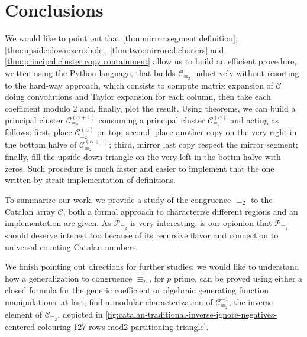 
\section{Conclusions}
\label{sec:conclusions}

We would like to point out that \autoref{thm:mirror:segment:definition},
\autoref{thm:upside:down:zero:hole}, \autoref{thm:two:mirrored:clusters} and
\autoref{thm:principal:cluster:copy:containment} allow us to build an efficient
procedure, written using the Python language, that builds $\mathcal{C}_{\equiv_{2}}$
inductively without resorting to the hard-way approach, which consists to compute
matrix expansion of $\mathcal{C}$ doing convolutions and Taylor expansion for each column, 
then take each coefficient modulo 2 and, finally, plot the result. Using theorems,
we can build a principal cluster $\mathcal{C}_{\equiv_{2}}^{(\alpha+1)}$ consuming
a principal cluster $\mathcal{C}_{\equiv_{2}}^{(\alpha)}$ and acting as follows:
first, place $\mathcal{C}_{\equiv_{2}}^{(\alpha)}$ on top; second, place another copy
on the very right in the bottom halve of $\mathcal{C}_{\equiv_{2}}^{(\alpha+1)}$;
third, mirror last copy respect the mirror segment; finally, fill the upside-down
triangle on the very left in the bottm halve with zeros. Such procedure is much faster
and easier to implement that the one written by strait implementation of definitions.

To summarize our work, we provide a study of the congruence $\equiv_{2}$ to the
Catalan array $\mathcal{C}$, both a formal approach to characterize different
regions and an implementation are given. As $\mathcal{P}_{\equiv_{2}}$ is very interesting,
is our opionion that $\mathcal{P}_{\equiv_{2}}$ should deserve interest too because
of its recursive flavor and connection to universal counting Catalan numbers.

We finish pointing out directions for further studies: we would like to understand
how a generalization to congruence $\equiv_{p}$, for $p$ prime, can be proved using
either a closed formula for the generic coefficient or algebraic generating function manipulations;
at last, find a modular characterization of $\mathcal{C}_{\equiv_{2}}^{-1}$, the inverse
element of $\mathcal{C}_{\equiv_{2}}$, depicted in 
\autoref{fig:catalan-traditional-inverse-ignore-negatives-centered-colouring-127-rows-mod2-partitioning-triangle}.


